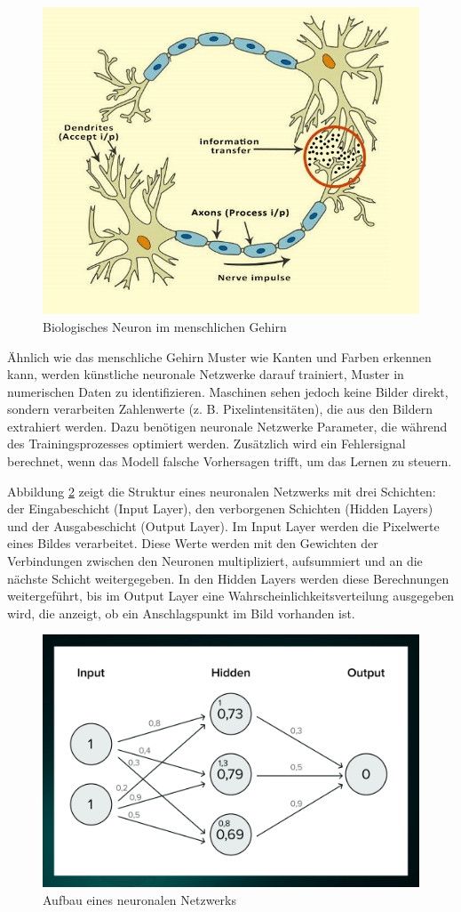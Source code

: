\begin{figure}[H]
    \centering
    \includegraphics[width=0.5\linewidth]{graphics/human_model.png}
    \caption{Biologisches Neuron im menschlichen Gehirn}
    \label{fig:humanCell}
\end{figure}

Ähnlich wie das menschliche Gehirn Muster wie Kanten und Farben erkennen kann, werden künstliche neuronale Netzwerke 
darauf trainiert, Muster in numerischen Daten zu identifizieren. Maschinen sehen jedoch keine Bilder direkt, sondern 
verarbeiten Zahlenwerte (z. B. Pixelintensitäten), die aus den Bildern extrahiert werden. Dazu benötigen neuronale 
Netzwerke Parameter, die während des Trainingsprozesses optimiert werden. Zusätzlich wird ein Fehlersignal berechnet, 
wenn das Modell falsche Vorhersagen trifft, um das Lernen zu steuern.

Abbildung \ref{fig:network} zeigt die Struktur eines neuronalen Netzwerks mit drei Schichten: der Eingabeschicht (Input Layer), 
den verborgenen Schichten (Hidden Layers) und der Ausgabeschicht (Output Layer). Im Input Layer werden die Pixelwerte 
eines Bildes verarbeitet. Diese Werte werden mit den Gewichten der Verbindungen zwischen den Neuronen multipliziert, 
aufsummiert und an die nächste Schicht weitergegeben. In den Hidden Layers werden diese Berechnungen weitergeführt, 
bis im Output Layer eine Wahrscheinlichkeitsverteilung ausgegeben wird, die anzeigt, ob ein Anschlagspunkt im Bild 
vorhanden ist.

\begin{figure}[H]
    \centering
    \includegraphics[width=0.5\linewidth]{graphics/network.png}
    \caption{Aufbau eines neuronalen Netzwerks}
    \label{fig:network}
\end{figure}

